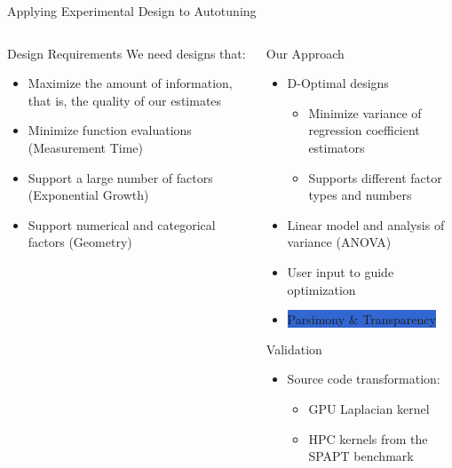 \documentclass[10pt, compress, aspectratio=169, xcolor={table,usenames,dvipsnames}]{beamer}
\begin{document}
\begin{frame}[label={sec:orgab61f3c}]{Applying Experimental Design to Autotuning}
\begin{columns}
\begin{column}{0.45\columnwidth}
\begin{block}{Design Requirements}
\vspace{.7em}
We need designs that:

\begin{itemize}
\item Maximize the amount of \alert{information}, that is, the quality of our estimates
\item Minimize function evaluations (\alert{Measurement Time})
\item Support a large number of factors (\alert{Exponential Growth})
\item Support numerical and categorical factors (\alert{Geometry})
\end{itemize}
\end{block}
\end{column}

\begin{column}{0.55\columnwidth}
\begin{block}{Our Approach}
\begin{itemize}
\item \alert{D-Optimal  designs}
\begin{itemize}
\item Minimize variance of regression coefficient estimators
\item Supports different factor types and numbers
\end{itemize}
\item Linear model and analysis of variance (ANOVA)
\item User input to guide optimization
\item \colorbox{Highlight}{\alert{Parsimony} \& \alert{Transparency}}
\end{itemize}

\begin{block}{Validation}
\begin{itemize}
\item Source code transformation:
\begin{itemize}
\item GPU Laplacian kernel
\item HPC kernels from the SPAPT benchmark
\end{itemize}
\end{itemize}
\end{block}
\end{block}
\end{column}
\end{columns}
\end{frame}
\end{document}

